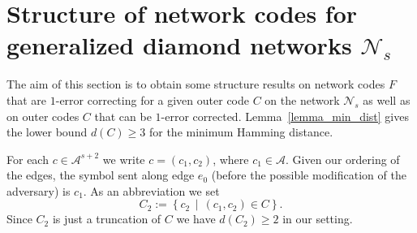 \documentclass[11pt]{article}
\newcommand{\cA}{\mathcal{A}}
\newcommand{\cN}{\mathcal{N}}
\newtheorem{lemma}[theorem]{Lemma}
\begin{document}
\section{Structure of network codes for generalized diamond networks $\cN_s$}
\label{sec_structure}

The aim of this section is to obtain some structure results on network codes $F$ that are $1$-error correcting for a given 
outer code $C$ on the network $\cN_s$ as well as on outer codes $C$ that can be $1$-error corrected.  
Lemma~\ref{lemma_min_dist} gives the lower bound $d(C)\ge 3$ for the minimum Hamming distance.



For each $c\in \cA^{s+2}$ we write $c=\left(c_1,c_2\right)$, where $c_1\in\cA$. Given our ordering of the edges, the symbol sent along 
edge $e_0$ (before the possible modification of the adversary) is $c_1$.
As an abbreviation we set 
\begin{equation}
  C_2:=\left\{c_2\,\mid\, \left(c_1,c_2\right)\in C\right\}.
\end{equation}  
Since $C_2$ is just a truncation of $C$ we have $d(C_2)\ge 2$ in our setting.
\end{document}
